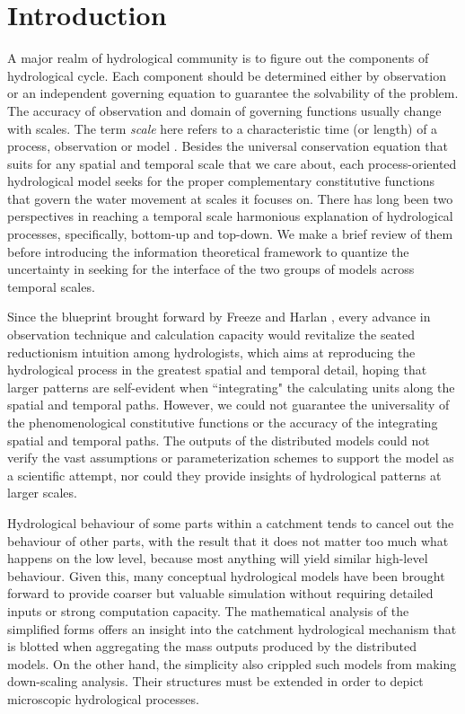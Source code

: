 \documentclass[review]{elsarticle}
\begin{document}
\linenumbers

 \section{Introduction}
A major realm of hydrological community is to figure out the components of hydrological cycle. Each component should be determined either by observation or an independent governing equation to guarantee the solvability of the problem. The accuracy of observation  and domain of governing functions usually change with scales. The term \emph{scale} here refers to a characteristic time (or length) of a process, observation or model \citep{bloschl1995scale}.  Besides the  universal conservation equation that suits for any spatial and temporal scale that we care about, each process-oriented hydrological model seeks for the proper complementary constitutive functions that govern the water movement at scales it focuses on. There has long been two perspectives in reaching a temporal scale harmonious explanation of hydrological processes, specifically, bottom-up and top-down. We make a brief review of them before introducing the information theoretical framework to quantize the uncertainty in seeking for the interface of the two groups of models across temporal scales. 

Since the blueprint brought forward by Freeze and Harlan \citep{freeze1969blueprint}, 
 every advance in observation technique and calculation capacity would revitalize the seated reductionism intuition among hydrologists, which aims at reproducing the hydrological process in the greatest spatial and temporal detail, hoping that larger patterns are self-evident when ``integrating" the calculating units along the spatial and temporal paths. However, we could not guarantee the universality of the phenomenological constitutive functions or the accuracy of the integrating spatial and temporal paths. The outputs of the distributed models could not verify the vast assumptions or parameterization schemes to support the model as a scientific attempt, nor could they provide insights of hydrological patterns at larger scales.  


Hydrological behaviour of some parts within a catchment tends to cancel out the behaviour of other parts, with the result that it does not matter too much what happens on the low level, because most anything will yield similar high-level behaviour\citep{hofstadter1980godel}. Given this, many conceptual hydrological models have been brought forward to provide  coarser but valuable simulation without requiring detailed inputs or strong computation capacity. The mathematical analysis of the simplified forms offers an insight into the catchment hydrological mechanism that is blotted when aggregating the mass outputs produced by the distributed models\citep{gerrits2009analytical,xu2014attribution}. On the other hand, the simplicity also crippled such models from making down-scaling analysis. Their structures must be extended in order to depict microscopic hydrological processes.
 
\end{document}
